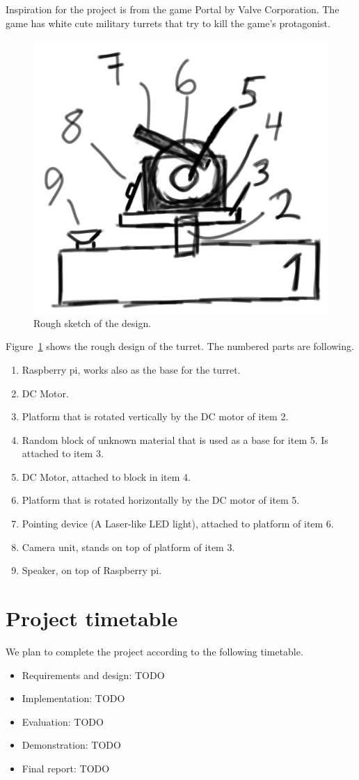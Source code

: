 \documentclass[english,11pt,twoside,a4paper]{article}
\begin{document}
Inspiration for the project is from the game Portal by Valve Corporation. The game has white cute military turrets that try to kill the game's protagonist.

\begin{figure}
  \begin{center}
    \includegraphics[scale=0.15]{design_sketch.png}
    \caption{Rough sketch of the design.}
  \end{center}
  \label{sketch}
\end{figure}

Figure~\ref{sketch} shows the rough design of the turret. The numbered parts are following.

\begin{enumerate}
  \item Raspberry pi, works also as the base for the turret.
  \item DC Motor.
  \item Platform that is rotated vertically by the DC motor of item 2.
  \item Random block of unknown material that is used as a base for item 5. Is attached to item 3.
  \item DC Motor, attached to block in item 4.
  \item Platform that is rotated horizontally by the DC motor of item 5.
  \item Pointing device (A Laser-like LED light), attached to platform of item 6.
  \item Camera unit, stands on top of platform of item 3.
  \item Speaker, on top of Raspberry pi.
\end{enumerate}

\section{Project timetable}

We plan to complete the project according to the following timetable.

\begin{itemize}
  \item Requirements and design: TODO
  \item Implementation: TODO
  \item Evaluation: TODO
  \item Demonstration: TODO
  \item Final report: TODO
\end{itemize}
\end{document}
